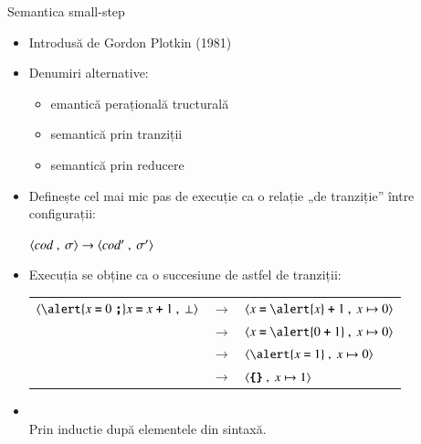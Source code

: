 \documentclass[xcolor=pdftex,romanian,colorlinks]{beamer}
\begin{document}

  \begin{frame}{Semantica small-step}

  \begin{itemize}
  \item Introdusă de Gordon Plotkin (1981) 
  \smallskip
  \item Denumiri alternative: 
  \begin{itemize}
	\item  {}emantică perațională tructurală
	\item  semantică prin tranziții
	\item  semantică prin reducere
  \end{itemize}
   \smallskip
  \item Definește cel mai mic pas de execuție ca o relație „de tranziție” între configurații:
  \begin{center}
	$\langle cod\ ,\ \sigma\rangle  \to  \langle cod'\ ,\ \sigma'\rangle$
  \end{center}
 \smallskip  
  \item Execuția se obține ca o succesiune de astfel de tranziții:
  
   \smallskip  
  \begin{tabular}{rcl}
  $\Conf{\alert{ x \terminal{=} 0 \terminal{;}}  x \terminal{=} x \terminal{+} 1 }{\bot}$ &  $ \to $  & $\Conf{x \terminal{=} \alert{x} \terminal{+} 1 }{x \mapsto 0}$ \\  
  &$ \to $& $\Conf{x \terminal{=} \alert{0 \terminal{+} 1} }{x \mapsto 0}$ \\  
  &$ \to $& $\Conf{\alert{x \terminal{=} 1 }}{x \mapsto 0}$ \\   
  &$ \to $& $\langle \mathrel{\textbf{\ttfamily \{}}\mathrel{\textbf{\ttfamily \}}}\ ,\ x \mapsto 1\rangle$
  \end{tabular}
    
  \item {} \\  Prin inductie după elementele din sintaxă.
    \end{itemize}
  \end{frame}
\end{document}
